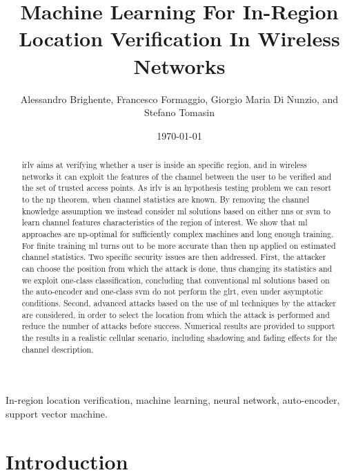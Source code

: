 \documentclass[draftcls,onecolumn,12pt]{IEEEtran}
\title{Machine Learning For In-Region Location Verification In Wireless Networks}
\author{\small Alessandro Brighente, Francesco Formaggio, Giorgio Maria Di Nunzio, and  Stefano Tomasin }
\date{\today}
\begin{document}
\maketitle

\sloppy

\begin{abstract}
\Ac{irlv} aims at verifying whether a user is inside an specific region, and in wireless networks it can exploit the features of the channel between the user to be verified and the set of trusted access points. As \ac{irlv} is an hypothesis testing problem we can resort to the \ac{np} theorem, when channel statistics are known. By removing the channel knowledge assumption we instead consider \ac{ml} solutions based on either \acp{nn} or \ac{svm} to learn channel features characteristics of the region of interest. We show that \ac{ml} approaches are \ac{np}-optimal for sufficiently complex machines and long enough training. For finite training \ac{ml} turns out to be more accurate than then \ac{np} applied on estimated channel statistics. Two specific security issues are then addressed. First, the attacker can choose the position from which the attack is done, thus changing its statistics and we exploit one-class classification, concluding that conventional \ac{ml} solutions based on the auto-encoder and one-class \ac{svm} do not perform the \ac{glrt}, even under asymptotic conditions. Second, advanced attacks based on the use of \ac{ml} techniques by the attacker are considered, in order to select the location from which the attack is performed and reduce the number of attacks before success. Numerical results are provided to support the results in a realistic cellular scenario, including shadowing and fading effects for the channel description.
\end{abstract}

\begin{IEEEkeywords}
In-region location verification, machine learning, neural network, auto-encoder, support vector machine.
\end{IEEEkeywords}

\glsresetall
\clearpage
\section{Introduction}
\end{document}
